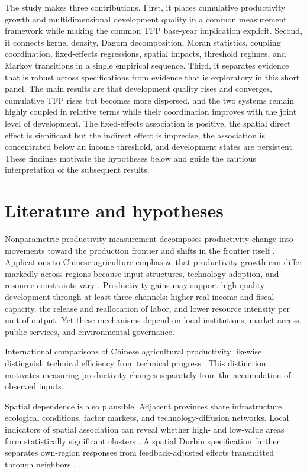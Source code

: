 \documentclass[sustainability,article,submit,moreauthors]{Definitions/mdpi}
\numberwithin{equation}{section}
\begin{document}
The study makes three contributions. First, it places cumulative productivity growth and multidimensional development quality in a common measurement framework while making the common TFP base-year implication explicit. Second, it connects kernel density, Dagum decomposition, Moran statistics, coupling coordination, fixed-effects regressions, spatial impacts, threshold regimes, and Markov transitions in a single empirical sequence. Third, it separates evidence that is robust across specifications from evidence that is exploratory in this short panel. The main results are that development quality rises and converges, cumulative TFP rises but becomes more dispersed, and the two systems remain highly coupled in relative terms while their coordination improves with the joint level of development. The fixed-effects association is positive, the spatial direct effect is significant but the indirect effect is imprecise, the association is concentrated below an income threshold, and development states are persistent. These findings motivate the hypotheses below and guide the cautious interpretation of the subsequent results.

\section{Literature and hypotheses}

Nonparametric productivity measurement decomposes productivity change into movements toward the production frontier and shifts in the frontier itself \cite{fare1994}. Applications to Chinese agriculture emphasize that productivity growth can differ markedly across regions because input structures, technology adoption, and resource constraints vary \cite{fan2002}. Productivity gains may support high-quality development through at least three channels: higher real income and fiscal capacity, the release and reallocation of labor, and lower resource intensity per unit of output. Yet these mechanisms depend on local institutions, market access, public services, and environmental governance.

International comparisons of Chinese agricultural productivity likewise
distinguish technical efficiency from technical progress \cite{che2010}.
This distinction motivates measuring productivity changes separately from
the accumulation of observed inputs.

Spatial dependence is also plausible. Adjacent provinces share infrastructure, ecological conditions, factor markets, and technology-diffusion networks. Local indicators of spatial association can reveal whether high- and low-value areas form statistically significant clusters \cite{moran1950,anselin1995}. A spatial Durbin specification further separates own-region responses from feedback-adjusted effects transmitted through neighbors \cite{lesage2009}.
\end{document}
